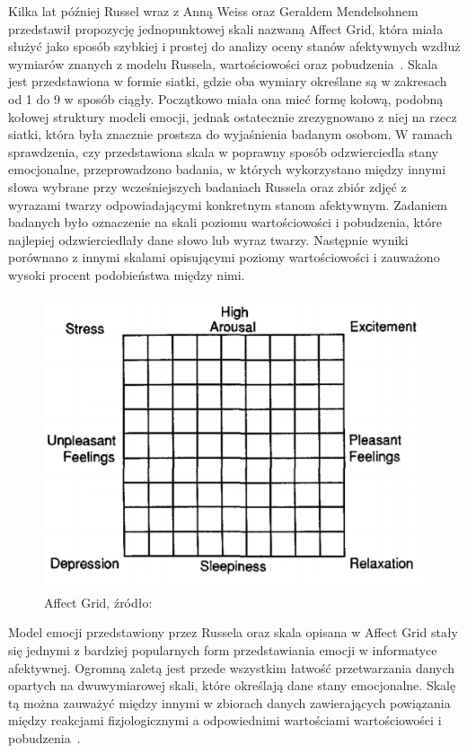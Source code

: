 Kilka lat później Russel wraz z Anną Weiss oraz Geraldem Mendelsohnem przedstawił propozycję jednopunktowej skali nazwaną Affect Grid, która miała służyć jako sposób szybkiej i prostej do analizy oceny stanów afektywnych wzdłuż wymiarów znanych z modelu Russela, wartościowości oraz pobudzenia~\cite{affect_grid_russel_1989}. Skala jest przedstawiona w formie siatki, gdzie oba wymiary określane są w zakresach od 1 do 9 w sposób ciągły. Początkowo miała ona mieć formę kołową, podobną kołowej struktury modeli emocji, jednak ostatecznie zrezygnowano z niej na rzecz siatki, która była znacznie prostsza do wyjaśnienia badanym osobom. W ramach sprawdzenia, czy przedstawiona skala w poprawny sposób odzwierciedla stany emocjonalne, przeprowadzono badania, w których wykorzystano między innymi słowa wybrane przy wcześniejszych badaniach Russela oraz zbiór zdjęć z wyrazami twarzy odpowiadającymi konkretnym stanom afektywnym. Zadaniem badanych było oznaczenie na skali poziomu wartościowości i pobudzenia, które najlepiej odzwierciedlały dane słowo lub wyraz twarzy. Następnie wyniki porównano z innymi skalami opisującymi poziomy wartościowości i zauważono wysoki procent podobieństwa między nimi. 

\begin{figure}[h]
	\centering
	\includegraphics[width=0.5\linewidth]{images/affect_grid.png}
	\caption{Affect Grid, źródło:~\cite{affect_grid_russel_1989}}
	\label{fig:affect_grid}
\end{figure}

Model emocji przedstawiony przez Russela oraz skala opisana w Affect Grid stały się jednymi z bardziej popularnych form przedstawiania emocji w informatyce afektywnej. Ogromną zaletą jest przede wszystkim łatwość przetwarzania danych opartych na dwuwymiarowej skali, które określają dane stany emocjonalne. Skalę tą można zauważyć między innymi w zbiorach danych zawierających powiązania między reakcjami fizjologicznymi a odpowiednimi wartościami wartościowości i pobudzenia~\cite{deap_dataset_2011,amigos_dataset_2017}. 

